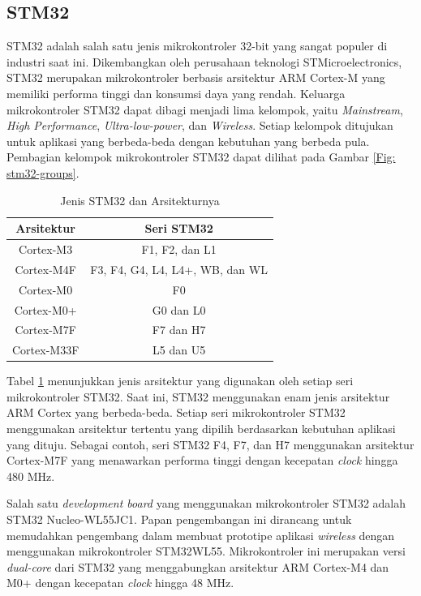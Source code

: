 \subsection{STM32}

STM32 adalah salah satu jenis mikrokontroler 32-bit yang sangat populer di industri saat ini. Dikembangkan oleh perusahaan teknologi STMicroelectronics, STM32 merupakan mikrokontroler berbasis arsitektur ARM Cortex-M yang memiliki performa tinggi dan konsumsi daya yang rendah. Keluarga mikrokontroler STM32 dapat dibagi menjadi lima kelompok, yaitu \textit{Mainstream}, \textit{High Performance}, \textit{Ultra-low-power}, dan \textit{Wireless}. Setiap kelompok ditujukan untuk aplikasi yang berbeda-beda dengan kebutuhan yang berbeda pula. Pembagian kelompok mikrokontroler STM32 dapat dilihat pada Gambar \ref{Fig: stm32-groups}.

\begin{table}[H]
	\caption{Jenis STM32 dan Arsitekturnya}
	\vspace{0.5em}
	\centering
	\begin{tabular}{cc}
		\hline
		\textbf{Arsitektur} & \textbf{Seri STM32} \\
		\hline 
		Cortex-M3 & F1, F2, dan L1\\
		Cortex-M4F & F3, F4, G4, L4, L4+, WB, dan WL\\
		Cortex-M0 & F0\\ 
		Cortex-M0+ & G0 dan L0\\
		Cortex-M7F & F7 dan H7\\ 
		Cortex-M33F & L5 dan U5\\ \hline
	\end{tabular}
	\label{Tab: stm-arch-table}
\end{table}

Tabel \ref{Tab: stm-arch-table} menunjukkan jenis arsitektur yang digunakan oleh setiap seri mikrokontroler STM32. Saat ini, STM32 menggunakan enam jenis arsitektur ARM Cortex yang berbeda-beda. Setiap seri mikrokontroler STM32 menggunakan arsitektur tertentu yang dipilih berdasarkan kebutuhan aplikasi yang dituju. Sebagai contoh, seri STM32 F4, F7, dan H7 menggunakan arsitektur Cortex-M7F yang menawarkan performa tinggi dengan kecepatan \textit{clock} hingga 480 MHz.

Salah satu \textit{development board} yang menggunakan mikrokontroler STM32 adalah STM32 Nucleo-WL55JC1. Papan pengembangan ini dirancang untuk memudahkan pengembang dalam membuat prototipe aplikasi \textit{wireless} dengan menggunakan mikrokontroler STM32WL55. Mikrokontroler ini merupakan versi \textit{dual-core} dari STM32 yang menggabungkan arsitektur ARM Cortex-M4 dan M0+ dengan kecepatan \textit{clock} hingga 48 MHz.

